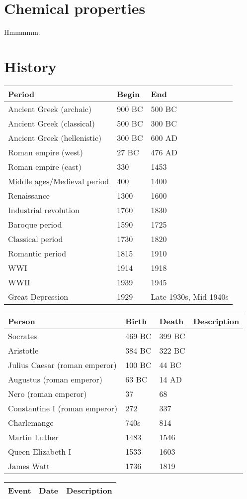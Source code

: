 \documentclass{article}
\begin{document}
\section{Chemical properties}
Hmmmmm.

\section{History}
\begin{table}[H]
	\centering
	\begin{tabularx}{0.75\textwidth}{ X X X }
		Period & Begin & End \\
		\hline
		Ancient Greek (archaic) & 900 BC & 500 BC \\
		Ancient Greek (classical) & 500 BC & 300 BC \\
		Ancient Greek (hellenistic) & 300 BC & 600 AD \\
		Roman empire (west) & 27 BC & 476 AD \\
		Roman empire (east) & 330 & 1453 \\
		Middle ages/Medieval period & 400 & 1400 \\
		Renaissance & 1300 & 1600 \\
		Industrial revolution & 1760 & 1830 \\
		Baroque period & 1590 & 1725 \\
		Classical period & 1730 & 1820 \\
		Romantic period & 1815 & 1910 \\
		WWI & 1914 & 1918 \\
		WWII & 1939 & 1945 \\
		Great Depression & 1929 & Late 1930s, Mid 1940s \\
	\end{tabularx}
\end{table}
\begin{table}[H]
	\centering
	\begin{tabularx}{\textwidth}{ X X X X }
		Person & Birth & Death & Description \\
		\hline
		Socrates & 469 BC & 399 BC & \\
		Aristotle & 384 BC & 322 BC & \\
		Julius Caesar (roman emperor) & 100 BC & 44 BC \\
		Augustus (roman emperor) & 63 BC & 14 AD \\
		Nero (roman emperor) & 37 & 68 \\
		Constantine I (roman emperor) & 272 & 337 \\
		Charlemange & 740s & 814 \\
		Martin Luther & 1483 & 1546 \\
		Queen Elizabeth I & 1533 & 1603 \\
		James Watt & 1736 & 1819 \\
	\end{tabularx}
\end{table}
\begin{table}[H]
	\centering
	\begin{tabularx}{0.75\textwidth}{ X X X }
		Event & Date & Description \\
		\hline
	\end{tabularx}
\end{table}
\end{document}
